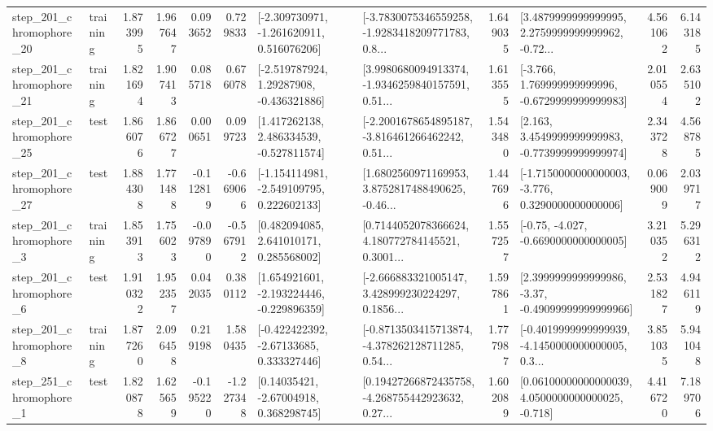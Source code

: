 \begin{tabular}{llrrrrllrlrr}
  step\_201\_chromophore\_20 &  training &      1.873995 &    1.967647 &      0.093652 &  0.729833 &   [-2.309730971, -1.261620911, 0.516076206] &  [-3.7830075346559258, -1.9283418209771783, 0.8... &       1.649035 &  [3.4879999999999995, 2.2759999999999962, -0.72... &            4.561062 &          6.143185 \\
  step\_201\_chromophore\_21 &  training &      1.821694 &    1.907413 &      0.085718 &  0.676078 &    [-2.519787924, 1.29287908, -0.436321886] &  [3.9980680094913374, -1.9346259840157591, 0.51... &       1.613555 &   [-3.766, 1.769999999999996, -0.6729999999999983] &            2.010554 &          2.635102 \\
  step\_201\_chromophore\_25 &      test &      1.866076 &    1.866727 &      0.000651 &  0.099723 &    [1.417262138, 2.486334539, -0.527811574] &  [-2.2001678654895187, -3.816461266462242, 0.51... &       1.543480 &   [2.163, 3.4549999999999983, -0.7739999999999974] &            2.343728 &          4.568785 \\
  step\_201\_chromophore\_27 &      test &      1.884308 &    1.771488 &     -0.112819 & -0.669066 &   [-1.154114981, -2.549109795, 0.222602133] &  [1.6802560971169953, 3.8752817488490625, -0.46... &       1.447696 &  [-1.7150000000000003, -3.776, 0.3290000000000006] &            0.069009 &          2.039717 \\
   step\_201\_chromophore\_3 &  training &      1.853913 &    1.756023 &     -0.097890 & -0.567912 &     [0.482094085, 2.641010171, 0.285568002] &  [0.7144052078366624, 4.180772784145521, 0.3001... &       1.557257 &               [-0.75, -4.027, -0.6690000000000005] &            3.210352 &          5.296312 \\
   step\_201\_chromophore\_6 &      test &      1.910322 &    1.952357 &      0.042035 &  0.380112 &   [1.654921601, -2.193224446, -0.229896359] &  [-2.666883321005147, 3.428999230224297, 0.1856... &       1.597861 &  [2.3999999999999986, -3.37, -0.49099999999999966] &            2.531827 &          4.946119 \\
   step\_201\_chromophore\_8 &  training &      1.877260 &    2.096458 &      0.219198 &  1.580435 &    [-0.422422392, -2.67133685, 0.333327446] &  [-0.8713503415713874, -4.378262128711285, 0.54... &       1.777987 &  [-0.4019999999999939, -4.1450000000000005, 0.3... &            3.851035 &          5.941048 \\
   step\_251\_chromophore\_1 &      test &      1.820878 &    1.625659 &     -0.195220 & -1.227348 &      [0.14035421, -2.67004918, 0.368298745] &  [0.19427266872435758, -4.268755442923632, 0.27... &       1.602089 &  [0.06100000000000039, 4.0500000000000025, -0.718] &            4.416720 &          7.189706 \\

\end{tabular}

